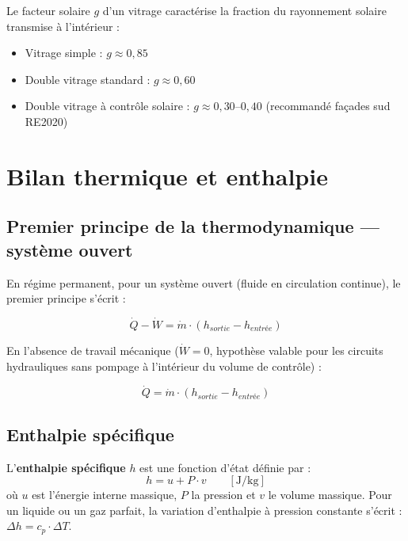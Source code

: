 Le facteur solaire \(g\) d'un vitrage caractérise la fraction du rayonnement solaire transmise à l'intérieur :
\begin{itemize}
  \item Vitrage simple : $g \approx 0{,}85$
  \item Double vitrage standard : $g \approx 0{,}60$
  \item Double vitrage à contrôle solaire : $g \approx 0{,}30$–$0{,}40$ (recommandé façades sud RE2020)
\end{itemize}

\section{Bilan thermique et enthalpie}

\subsection{Premier principe de la thermodynamique — système ouvert}

En régime permanent, pour un système ouvert (fluide en circulation continue), le premier
principe s'écrit :

\begin{equation}
  \dot{Q} - \dot{W} = \dot{m} \cdot (h_{sortie} - h_{entrée})
  \label{eq:premier_principe_ouvert}
\end{equation}

En l'absence de travail mécanique (\(\dot{W} = 0\), hypothèse valable pour les circuits
hydrauliques sans pompage à l'intérieur du volume de contrôle) :

\begin{equation}
  \dot{Q} = \dot{m} \cdot (h_{sortie} - h_{entrée})
  \label{eq:bilan_enthalpique}
\end{equation}

\subsection{Enthalpie spécifique}

\begin{definition}
  L'\textbf{enthalpie spécifique} \(h\) est une fonction d'état définie par :
  \begin{equation}
    h = u + P \cdot v \qquad \left[\si{\joule\per\kilogram}\right]
    \label{eq:enthalpie}
  \end{equation}
  où \(u\) est l'énergie interne massique, \(P\) la pression et \(v\) le volume massique.
  Pour un liquide ou un gaz parfait, la variation d'enthalpie à pression constante s'écrit :
  \(\Delta h = c_p \cdot \Delta T\).
\end{definition}


